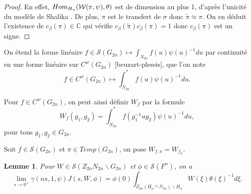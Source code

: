 \documentclass{amsart}
\newtheorem{lemme}{Lemme}[section]
\DeclareMathOperator{\Hom}{\mathnormal{Hom}}
\begin{document}
\begin{proof}
En effet, $\Hom_{H_n}(\mathcal{W}(\pi, \psi), \theta)$ est de dimension au plus 1, d'après l'unicité du modèle de Shalika \cite{jacquet-rallis}. De plus, $\pi$ est le transfert de $\sigma$ donc $\widetilde{\pi} \simeq \pi$. On en déduit l'existence de $c_\beta(\pi) \in \mathbb{C}$ qui vérifie $c_\beta(\widetilde{\pi})c_\beta(\pi) = 1$ donc $c_\beta(\pi)$ est un signe.
\end{proof}

On étend la forme linéaire $f \in \mathcal{S}(G_{2n}) \mapsto \int_{N_{2n}} f(u)\psi(u)^{-1} du$ par continuité en une forme linéaire sur $C^w(G_{2n})$ [beuzart-plessis], que l'on note
\begin{equation}
f \in C^w(G_{2n}) \mapsto \int_{N_{2n}}^* f(u)\psi(u)^{-1} du.
\end{equation}

Pour $f \in C^w(G_{2n})$, on peut ainsi définir $W_f$ par la formule
\begin{equation}
W_f(g_1, g_2) = \int_{N_{2n}}^* f(g_1^{-1}ug_2)\psi(u)^{-1} du,
\end{equation}
pour tous $g_1, g_2 \in G_{2n}$.

Soit $f \in \mathcal{S}(G_{2n})$ et $\pi \in Temp(G_{2n})$, on pose $W_{f, \pi} = W_{f_\pi}$.

\begin{lemme}
\label{limitezeta}
Pour $W \in \mathcal{S}(Z_{2n} N_{2n} \backslash G_{2n})$ et $\phi \in \mathcal{S}(F^n)$, on a
\begin{equation}
\lim_{s\rightarrow 0^+} \gamma(ns, 1, \psi) J(s, W, \phi) = \phi(0) \int_{Z_{2n}(H_n \cap N_{2n}) \backslash H_n} W(\xi) \theta(\xi)^{-1} d\xi.
\end{equation}
\end{lemme}
\end{document}
